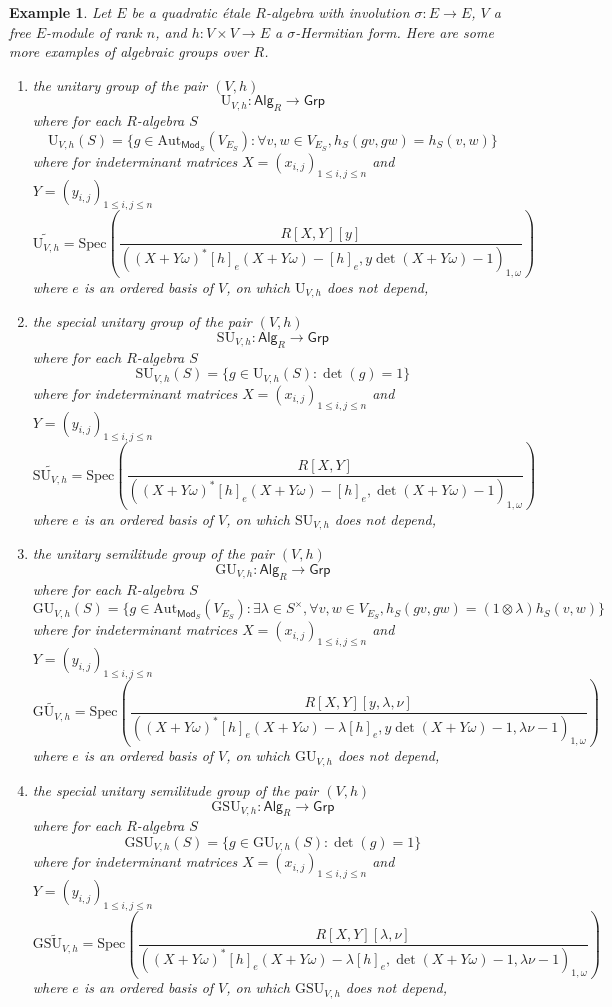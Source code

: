 \documentclass[10pt]{book}
\theoremstyle{bookplain}
\theoremstyle{bookdefinition}
\newtheorem{example}[theorem]{Example}
\theoremstyle{bookremark}
\begin{document}
\begin{example}
    \label{ex:unitary}
    Let $E$ be a quadratic étale $R$-algebra with involution $\sigma:E\rightarrow E$, $V$ a free $E$-module of rank $n$, and $h:V\times V\rightarrow E$ a $\sigma$-Hermitian form. Here are some more examples of algebraic groups over $R$. 
    \begin{enumerate}
        \item the \textit{unitary group} of the pair $(V,h)$
        \[\mathrm{U}_{V,h}:\mathsf{Alg}_R\rightarrow \mathsf{Grp}\]
        where for each $R$-algebra $S$
        \[\mathrm{U}_{V,h}(S)=\{g\in\mathrm{Aut}_{\mathsf{Mod}_S}(V_{E_S}):\forall v,w\in V_{E_S}, h_S(gv,gw)=h_S(v,w)\}\]
        where for indeterminant matrices $X=(x_{i,j})_{1\le i,j\le n}$ and $Y=(y_{i,j})_{1\le i,j\le n}$ 
        \[\widetilde{\mathrm{U}_{V,h}}=\mathrm{Spec}\left(\frac{R[X,Y][y]}{((X+Y\omega)^*[h]_e(X+Y\omega)-[h]_e,y\det(X+Y\omega)-1)_{1,\omega}}\right)\]
        where $e$ is an ordered basis of $V$, on which $\mathrm{U}_{V,h}$ does not depend, 
        \item the \textit{special unitary group} of the pair $(V,h)$
        \[\mathrm{SU}_{V,h}:\mathsf{Alg}_R\rightarrow \mathsf{Grp}\]
        where for each $R$-algebra $S$
        \[\mathrm{SU}_{V,h}(S)=\{g\in\mathrm{U}_{V,h}(S):\det(g)=1\}\]
        where for indeterminant matrices $X=(x_{i,j})_{1\le i,j\le n}$ and $Y=(y_{i,j})_{1\le i,j\le n}$ 
        \[\widetilde{\mathrm{SU}_{V,h}}=\mathrm{Spec}\left(\frac{R[X,Y]}{((X+Y\omega)^*[h]_e(X+Y\omega)-[h]_e,\det(X+Y\omega)-1)_{1,\omega}}\right)\]
        where $e$ is an ordered basis of $V$, on which $\mathrm{SU}_{V,h}$ does not depend, 
        \item the \textit{unitary semilitude group} of the pair $(V,h)$
        \[\mathrm{GU}_{V,h}:\mathsf{Alg}_R\rightarrow \mathsf{Grp}\]
        where for each $R$-algebra $S$
        \[\mathrm{GU}_{V,h}(S)=\{g\in\mathrm{Aut}_{\mathsf{Mod}_S}(V_{E_S}):\exists\lambda\in S^\times,\forall v,w\in V_{E_S}, h_S(gv,gw)=(1\otimes\lambda) h_S(v,w)\}\]
        where for indeterminant matrices $X=(x_{i,j})_{1\le i,j\le n}$ and $Y=(y_{i,j})_{1\le i,j\le n}$ 
        \[\widetilde{\mathrm{GU}_{V,h}}=\mathrm{Spec}\left(\frac{R[X,Y][y,\lambda,\nu]}{((X+Y\omega)^*[h]_e(X+Y\omega)-\lambda[h]_e,y\det(X+Y\omega)-1, \lambda\nu-1)_{1,\omega}}\right)\]
        where $e$ is an ordered basis of $V$, on which $\mathrm{GU}_{V,h}$ does not depend, 
        \item the \textit{special unitary semilitude group} of the pair $(V,h)$
        \[\mathrm{GSU}_{V,h}:\mathsf{Alg}_R\rightarrow \mathsf{Grp}\]
        where for each $R$-algebra $S$
        \[\mathrm{GSU}_{V,h}(S)=\{g\in\mathrm{GU}_{V,h}(S):\det(g)=1\}\]
        where for indeterminant matrices $X=(x_{i,j})_{1\le i,j\le n}$ and $Y=(y_{i,j})_{1\le i,j\le n}$ 
        \[\widetilde{\mathrm{GSU}_{V,h}}=\mathrm{Spec}\left(\frac{R[X,Y][\lambda,\nu]}{((X+Y\omega)^*[h]_e(X+Y\omega)-\lambda[h]_e,\det(X+Y\omega)-1, \lambda\nu-1)_{1,\omega}}\right)\]
        where $e$ is an ordered basis of $V$, on which $\mathrm{GSU}_{V,h}$ does not depend, 
        
    \end{enumerate}
\end{example}
\end{document}
